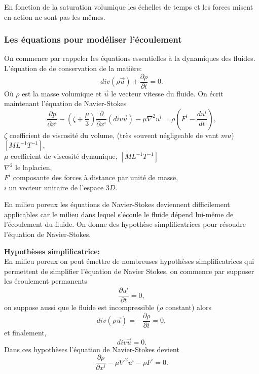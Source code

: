 \documentclass[a4paper,10pt]{article}
\begin{document}
En fonction de la saturation volumique les échelles de temps et les forces misent en action ne sont pas les mêmes.


\subsubsection{Les équations pour modéliser l'écoulement}
\label{darcy}
On commence par rappeler les équations essentielles à la dynamiques des fluides. 
L'équation de de conservation de la matière:
\begin{equation}
	\label{cons-mat}
	div(\rho \overrightarrow{u})+\frac{\partial \rho}{\partial t}=0.
\end{equation}
Où $\rho$ est la masse volumique et $\overrightarrow{u}$ le vecteur vitesse du fluide. On écrit maintenant l'équation de Navier-Stokes
\begin{equation}
	\frac{\partial p}{\partial x^i}-(\zeta+\frac{\mu}{3})\frac{\partial}{\partial x^i}(div\overrightarrow{u}) - \mu \nabla^2u^i=\rho(F^i -\frac{du^i}{dt}),
\end{equation}
$\zeta$ coefficient de viscosité du volume, (très souvent négligeable de vant $mu$) $[ML^{-1}T^{-1}]$,\\
$\mu$ coefficient de viscosité dynamique, $[ML^{-1}T^{-1}]$\\
$\nabla^2$ le laplacien,\\
$F^i$ composante des forces à distance par unité de masse,\\
$i$ un vecteur unitaire de l'espace $3D$.

En milieu poreux les équations de Navier-Stokes deviennent difficilement applicables car le milieu dans lequel s'écoule le fluide dépend lui-même de l'écoulement du fluide. On donne des hypothèse simplificatrices pour résoudre l'équation de Navier-Stokes. 

\noindent \textbf{Hypothèses simplificatrice:}\\
En milieu poreux on peut émettre de nombreuses hypothèses simplificatrices qui permettent de simplifier l'équation de Navier Stokes, on commence par supposer les écoulement permanents
\[\frac{\partial u^i}{\partial t}=0,\]
on suppose aussi que le fluide est incompressible ($\rho$ constant) alors
\[div(\rho \overrightarrow{u})=-\frac{\partial \rho}{\partial t}=0,\]
et finalement,
\[div \overrightarrow{u}=0.\]
Dans ces hypothèses l'équation de Navier-Stokes devient
\begin{equation}
	\label{eq-cons-m-simp}
	\frac{\partial p}{\partial x^i}-\mu \nabla^2u^i-\rho F^i=0. 
\end{equation}
\end{document}
